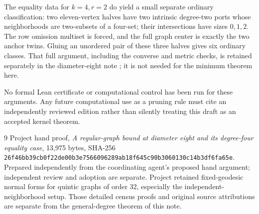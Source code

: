 \documentclass[11pt]{article}
\begin{document}
The equality data for $k=4,r=2$ do yield a small separate ordinary
classification: two eleven-vertex halves have two intrinsic
degree-two ports whose neighborhoods are two-subsets of a four-set;
their intersections have sizes $0,1,2$. The row omission multiset
is forced, and the full graph center is exactly the two anchor
twins. Gluing an unordered pair of these three halves gives six
ordinary classes. That full argument, including the converse and
metric checks, is retained separately in the diameter-eight note
\cite{eight}; it is not needed for the minimum theorem here.

No formal Lean certificate or computational control has been run
for these arguments. Any future computational use as a pruning
rule must cite an independently reviewed edition rather than
silently treating this draft as an accepted kernel theorem.

\begin{thebibliography}{9}
 Project hand proof, \emph{A regular-graph bound at
diameter eight and its degree-four equality case}, 13,975 bytes,
SHA-256 \texttt{26f46bb39cb0f22de00b3e7566096289ab18f645c90b3060130c14b3df6fa65e}.
Prepared independently from the coordinating agent's proposed hand
argument; independent review and adoption are separate.
 Project retained fixed-geodesic normal forms for
quintic graphs of order 32, especially the independent-neighborhood
setup. Those detailed census proofs and original source attributions
are separate from the general-degree theorem of this note.
\end{thebibliography}
\end{document}
